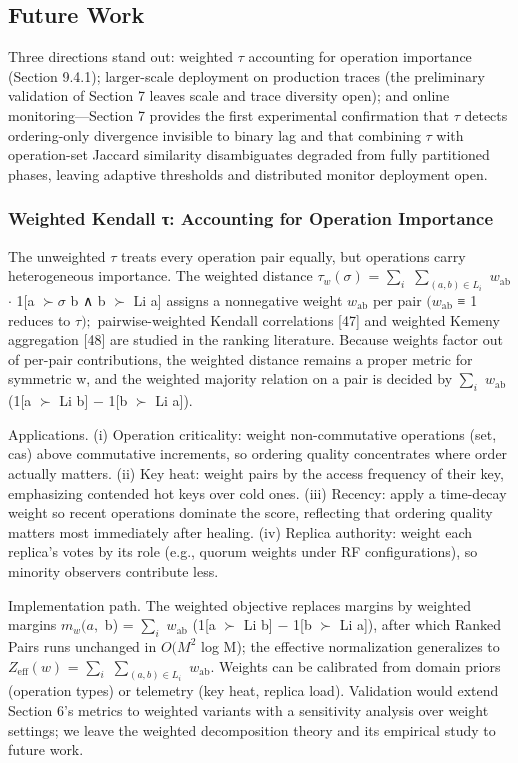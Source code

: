 \documentclass[10pt,twocolumn]{article}
\begin{document}
\subsection{Future Work}
Three directions stand out: weighted $\tau$ accounting for operation importance (Section 9.4.1); larger-scale deployment on production traces (the preliminary validation of Section 7 leaves scale and trace diversity open); and online monitoring—Section 7 provides the first experimental confirmation that $\tau$ detects ordering-only divergence invisible to binary lag and that combining $\tau$ with operation-set Jaccard similarity disambiguates degraded from fully partitioned phases, leaving adaptive thresholds and distributed monitor deployment open.

\subsubsection{Weighted Kendall τ: Accounting for Operation Importance}
The unweighted $\tau$ treats every operation pair equally, but operations carry heterogeneous importance. The weighted distance $\tau_{w}(\sigma)$ = $\sum_{i}$ $\sum_{(a,b)\in L_{i}}$ $w_{\mathrm{ab}}$ $\cdot$ 1[a $\succ\sigma$ b ∧ b $\succ$ Li a] assigns a nonnegative weight $w_{\mathrm{ab}}$ per pair $(w_{\mathrm{ab}}$ ≡ 1 reduces to $\tau);$ pairwise-weighted Kendall correlations [47] and weighted Kemeny aggregation [48] are studied in the ranking literature. Because weights factor out of per-pair contributions, the weighted distance remains a proper metric for symmetric w, and the weighted majority relation on a pair is decided by $\sum_{i}$ $w_{\mathrm{ab}}$ (1[a $\succ$ Li b] $-$ 1[b $\succ$ Li a]).

Applications. (i) Operation criticality: weight non-commutative operations (set, cas) above commutative increments, so ordering quality concentrates where order actually matters. (ii) Key heat: weight pairs by the access frequency of their key, emphasizing contended hot keys over cold ones. (iii) Recency: apply a time-decay weight so recent operations dominate the score, reflecting that ordering quality matters most immediately after healing. (iv) Replica authority: weight each replica's votes by its role (e.g., quorum weights under RF configurations), so minority observers contribute less.

Implementation path. The weighted objective replaces margins by weighted margins $m_{w}(a,$ b) = $\sum_{i}$ $w_{\mathrm{ab}}$ (1[a $\succ$ Li b] $-$ 1[b $\succ$ Li a]), after which Ranked Pairs runs unchanged in $O(M^{2}$ log M); the effective normalization generalizes to $Z_{\mathrm{eff}}(w)$ = $\sum_{i}$ $\sum_{(a,b)\in L_{i}}$ $w_{\mathrm{ab}}.$ Weights can be calibrated from domain priors (operation types) or telemetry (key heat, replica load). Validation would extend Section 6's metrics to weighted variants with a sensitivity analysis over weight settings; we leave the weighted decomposition theory and its empirical study to future work.
\end{document}
